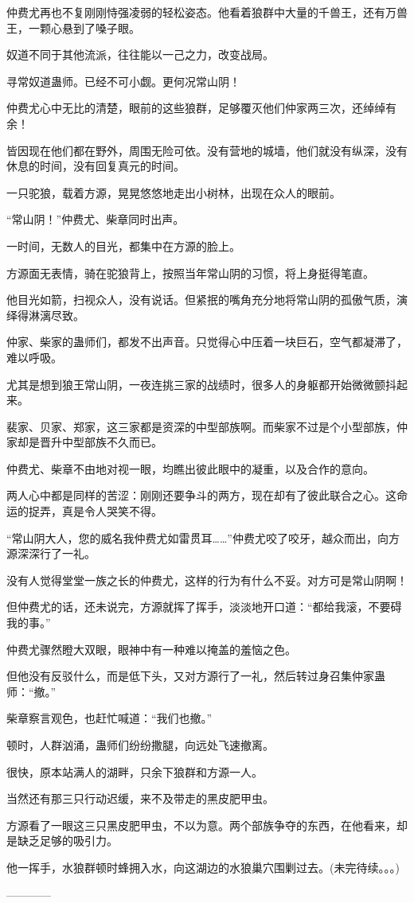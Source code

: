 \begin{this_body}
仲费尤再也不复刚刚恃强凌弱的轻松姿态。他看着狼群中大量的千兽王，还有万兽王，一颗心悬到了嗓子眼。

奴道不同于其他流派，往往能以一己之力，改变战局。

寻常奴道蛊师。已经不可小觑。更何况常山阴！

仲费尤心中无比的清楚，眼前的这些狼群，足够覆灭他们仲家两三次，还绰绰有余！

皆因现在他们都在野外，周围无险可依。没有营地的城墙，他们就没有纵深，没有休息的时间，没有回复真元的时间。

一只驼狼，载着方源，晃晃悠悠地走出小树林，出现在众人的眼前。

“常山阴！”仲费尤、柴章同时出声。

一时间，无数人的目光，都集中在方源的脸上。

方源面无表情，骑在驼狼背上，按照当年常山阴的习惯，将上身挺得笔直。

他目光如箭，扫视众人，没有说话。但紧抿的嘴角充分地将常山阴的孤傲气质，演绎得淋漓尽致。

仲家、柴家的蛊师们，都发不出声音。只觉得心中压着一块巨石，空气都凝滞了，难以呼吸。

尤其是想到狼王常山阴，一夜连挑三家的战绩时，很多人的身躯都开始微微颤抖起来。

裴家、贝家、郑家，这三家都是资深的中型部族啊。而柴家不过是个小型部族，仲家却是晋升中型部族不久而已。

仲费尤、柴章不由地对视一眼，均瞧出彼此眼中的凝重，以及合作的意向。

两人心中都是同样的苦涩：刚刚还要争斗的两方，现在却有了彼此联合之心。这命运的捉弄，真是令人哭笑不得。

“常山阴大人，您的威名我仲费尤如雷贯耳……”仲费尤咬了咬牙，越众而出，向方源深深行了一礼。

没有人觉得堂堂一族之长的仲费尤，这样的行为有什么不妥。对方可是常山阴啊！

但仲费尤的话，还未说完，方源就挥了挥手，淡淡地开口道：“都给我滚，不要碍我的事。”

仲费尤骤然瞪大双眼，眼神中有一种难以掩盖的羞恼之色。

但他没有反驳什么，而是低下头，又对方源行了一礼，然后转过身召集仲家蛊师：“撤。”

柴章察言观色，也赶忙喊道：“我们也撤。”

顿时，人群汹涌，蛊师们纷纷撒腿，向远处飞速撤离。

很快，原本站满人的湖畔，只余下狼群和方源一人。

当然还有那三只行动迟缓，来不及带走的黑皮肥甲虫。

方源看了一眼这三只黑皮肥甲虫，不以为意。两个部族争夺的东西，在他看来，却是缺乏足够的吸引力。

他一挥手，水狼群顿时蜂拥入水，向这湖边的水狼巢穴围剿过去。(未完待续。。。)

------------

\end{this_body}

